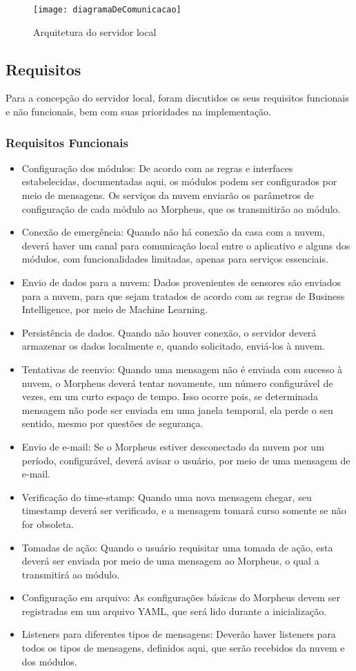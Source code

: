 \begin{figure}[H]
	\centering
	\caption{Arquitetura do servidor local}
  \texttt{[image: diagramaDeComunicacao]}
\label{fig:diagramaDeComunicacao}
\end{figure}

\subsection{Requisitos}
Para a concepção do servidor local, foram discutidos os seus requisitos funcionais e não funcionais, bem com suas prioridades na implementação.

\subsubsection{Requisitos Funcionais}
\begin{itemize}
\item Configuração dos módulos: De acordo com as regras e interfaces estabelecidas, documentadas aqui, os módulos podem ser configurados por meio de mensagens. Os serviços da nuvem enviarão os parâmetros de configuração de cada módulo ao Morpheus, que os transmitirão ao módulo.
\item Conexão de emergência: Quando não há conexão da casa com a nuvem, deverá haver um canal para comunicação local entre o aplicativo e alguns dos módulos, com funcionalidades limitadas, apenas para serviços essenciais.
\item Envio de dados para a nuvem: Dados provenientes de sensores são enviados para a nuvem, para que sejam tratados de acordo com as regras de Business Intelligence, por meio de Machine Learning.
\item Persistência de dados. Quando não houver conexão, o servidor deverá armazenar os dados localmente e, quando solicitado, enviá-los à nuvem.
\item Tentativas de reenvio: Quando uma mensagem não é enviada com sucesso à nuvem, o Morpheus deverá tentar novamente, um número configurável de vezes, em um curto espaço de tempo. Isso ocorre pois, se determinada mensagem não pode ser enviada em uma janela temporal, ela perde o seu sentido, mesmo por questões de segurança.
\item Envio de e-mail: Se o Morpheus estiver desconectado da nuvem por um período, configurável, deverá avisar o usuário, por meio de uma mensagem de e-mail.
\item Verificação do time-stamp: Quando uma nova mensagem chegar, seu timestamp deverá ser verificado, e a mensagem tomará curso somente se não for obsoleta.
\item Tomadas de ação: Quando o usuário requisitar uma tomada de ação, esta deverá ser enviada por meio de uma mensagem ao Morpheus, o qual a transmitirá ao módulo.
\item Configuração em arquivo: As configurações básicas do Morpheus devem ser registradas em um arquivo YAML, que será lido durante a inicialização.
\item Listeners para diferentes tipos de mensagens: Deverão haver listeners para todos os tipos de mensagens, definidos aqui, que serão recebidos da nuvem e dos módulos.
\end{itemize}

